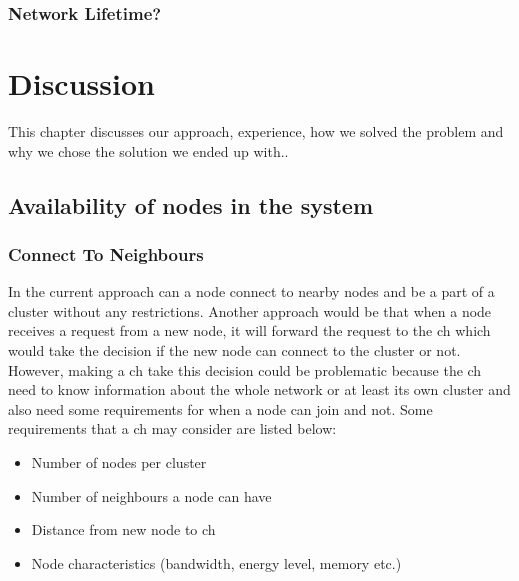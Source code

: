 \documentclass[USenglish]{uit-thesis}
\begin{document}
\subsection{Network Lifetime?}




\chapter{Discussion}
This chapter discusses our approach, experience, how we solved the problem and why we chose the solution we ended up with..

\section{Availability of nodes in the system}

\subsection{Connect To Neighbours} \label{disc:conn_neighbours}


In the current approach can a node connect to nearby nodes and be a part of a cluster without any restrictions. Another approach would be that when a node receives a request from a new node, it will forward the request to the \gls{ch} which would take the decision if the new node can connect to the cluster or not. However, making a \gls{ch} take this decision could be problematic because the \gls{ch} need to know information about the whole network or at least its own cluster and also need some requirements for when a node can join and not. Some requirements that a \gls{ch} may consider are listed below:

\begin{itemize}
\item Number of nodes per cluster
\item Number of neighbours a node can have
\item Distance from new node to \gls{ch}
\item Node characteristics (bandwidth, energy level, memory etc.)
\end{itemize}
\end{document}
